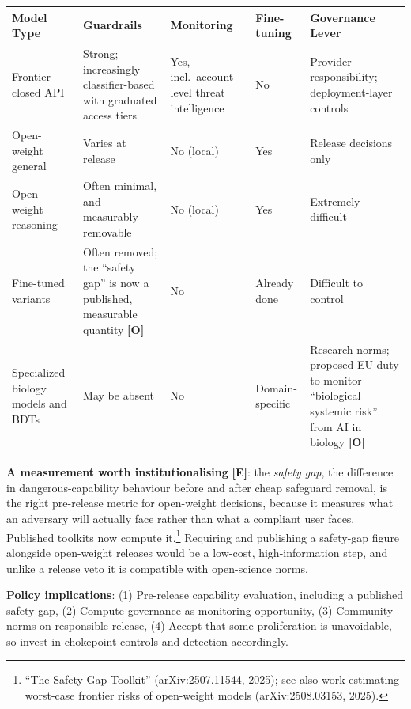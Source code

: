 \documentclass[11pt,letterpaper]{article}
\begin{document}
\begin{center}
\small
\begin{tabular}{L{3cm}L{3.4cm}L{2.2cm}L{1.6cm}L{3.2cm}}
\toprule
\textbf{Model Type} & \textbf{Guardrails} & \textbf{Monitoring} & \textbf{Fine-tuning} & \textbf{Governance Lever} \\
\midrule
Frontier closed API & Strong; increasingly classifier-based with graduated access tiers & Yes, incl.\ account-level threat intelligence & No & Provider responsibility; deployment-layer controls \\
Open-weight general & Varies at release & No (local) & Yes & Release decisions only \\
Open-weight reasoning & Often minimal, and measurably removable & No (local) & Yes & Extremely difficult \\
Fine-tuned variants & Often removed; the ``safety gap'' is now a published, measurable quantity \textbf{[O]} & No & Already done & Difficult to control \\
Specialized biology models and BDTs & May be absent & No & Domain-specific & Research norms; proposed EU duty to monitor ``biological systemic risk'' from AI in biology \textbf{[O]} \\
\bottomrule
\end{tabular}
\end{center}

\textbf{A measurement worth institutionalising} \textbf{[E]}: the \textit{safety gap}, the difference in dangerous-capability behaviour before and after cheap safeguard removal, is the right pre-release metric for open-weight decisions, because it measures what an adversary will actually face rather than what a compliant user faces. Published toolkits now compute it.\footnote{``The Safety Gap Toolkit'' (arXiv:2507.11544, 2025); see also work estimating worst-case frontier risks of open-weight models (arXiv:2508.03153, 2025).} Requiring and publishing a safety-gap figure alongside open-weight releases would be a low-cost, high-information step, and unlike a release veto it is compatible with open-science norms.

\textbf{Policy implications}: (1) Pre-release capability evaluation, including a published safety gap, (2) Compute governance as monitoring opportunity, (3) Community norms on responsible release, (4) Accept that some proliferation is unavoidable, so invest in chokepoint controls and detection accordingly.
\end{document}
